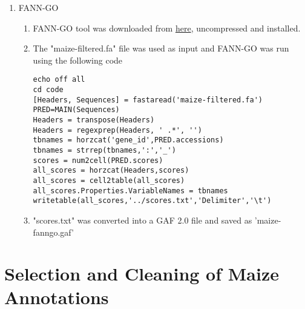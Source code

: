 \documentclass[11pt,letterpaper]{article}
\begin{document}
\begin{enumerate}
\begin{enumerate}
\begin{lstlisting}[breaklines]
[EVALUATION] ### IF YOU DON'T KNOW WHAT YOU ARE DOING, DON'T CHANGE ANYTHING FROM THIS ON!!!!
PRINT_EVAL=False
TEST=False
OTHER=False
      \end{lstlisting}
      \item PANNZER was run for each config file
      \item All results files from each split fasta files were concatenated and converted to a GAF 2.0 file
      \item GAF file was saved as 'maize-pannzer.gaf'
    \end{enumerate}
    \item FANN-GO
    \begin{enumerate}
      \item FANN-GO tool was downloaded from \href{http://montana.informatics.indiana.edu/fanngo/fanngo.html}{here}, uncompressed and installed.
      \item The "maize-filtered.fa" file was used as input and FANN-GO was run using the following code
      \begin{verbatim}
echo off all
cd code
[Headers, Sequences] = fastaread('maize-filtered.fa')
PRED=MAIN(Sequences)
Headers = transpose(Headers)
Headers = regexprep(Headers, ' .*', '')
tbnames = horzcat('gene_id',PRED.accessions)
tbnames = strrep(tbnames,':','_')
scores = num2cell(PRED.scores)
all_scores = horzcat(Headers,scores)
all_scores = cell2table(all_scores)
all_scores.Properties.VariableNames = tbnames
writetable(all_scores,'../scores.txt','Delimiter','\t')
    \end{verbatim}
    \item "scores.txt" was converted into a GAF 2.0 file and saved as 'maize-fanngo.gaf'
    \end{enumerate}
  \end{enumerate}
  \section{Selection and Cleaning of Maize Annotations}
\end{document}
